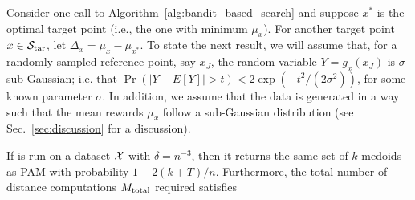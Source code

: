 Consider one call to Algorithm~\ref{alg:bandit_based_search} and suppose $x^*$ is the optimal target point (i.e., the one with minimum $\mu_x$).
For another target point $x \in \mathcal{S}_{\text{tar}}$,
let $\Delta_x = \mu_x - \mu_{x^*}$.
To state the next result, we will assume that, for a randomly sampled reference point, say $x_J$,
the random variable $Y = g_x(x_J)$ is $\sigma$-sub-Gaussian; i.e. that $\Pr(|Y-E[Y]| > t) < 2 \exp\left(-t^2/(2 \sigma^2)\right)$, for some known parameter $\sigma$.
In addition, we assume that the data is generated in a way such that the mean rewards $\mu_x$ follow a sub-Gaussian distribution (see Sec.~\ref{sec:discussion} for a discussion).






\begin{theorem} \label{thm:nlogn}
If \algname is run on a dataset ${\mathcal X}$ with $\delta = n^{-3}$, then it returns the same set of $k$ medoids as PAM with probability $1-2(k+T)/n$. 
Furthermore, 
the total number of distance computations $M_{\rm total}$ required satisfies
\end{theorem}


